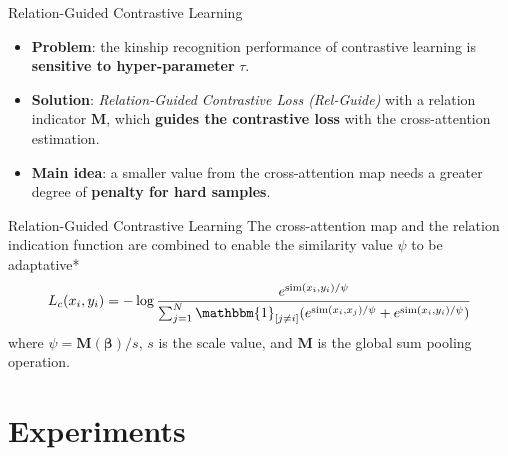 \documentclass[aspectratio=169,xcolor=dvipsnames]{beamer}
\begin{document}

\begin{frame}{Relation-Guided Contrastive Learning}
    \begin{itemize}
        \item \textbf{Problem}: the kinship recognition performance of contrastive learning is \textbf{sensitive to hyper-parameter} $\tau$.
        \item \textbf{Solution}: \textit{Relation-Guided Contrastive Loss (Rel-Guide)} with a relation indicator $\mathbf{M}$, which \textbf{guides the contrastive loss} with the cross-attention estimation.
        \item \textbf{Main idea}: a smaller value from the cross-attention map needs a greater degree of \textbf{penalty for hard samples}.
    \end{itemize}
\end{frame}


\begin{frame}{Relation-Guided Contrastive Learning}
    The cross-attention map and the relation indication function are combined to enable the similarity value $\psi$ to be adaptative*
    \pause
    \begin{equation}
      L_c(x_i, y_i) = -\log \frac{e^{\text{sim}(x_i, y_i)/\psi}}{\sum_{j=1}^N \mathbbm{1}_{[j \neq i]} (e^{\text{sim}(x_i, x_j)/\psi} + e^{\text{sim}(x_i, y_i)/\psi})}
    \end{equation}
    \pause
    where $\psi = \mathbf{M}(\mathbf{\beta})/s$, $s$ is the scale value, and $\mathbf{M}$ is the global sum pooling operation.
\end{frame}


\section{Experiments}
\end{document}
